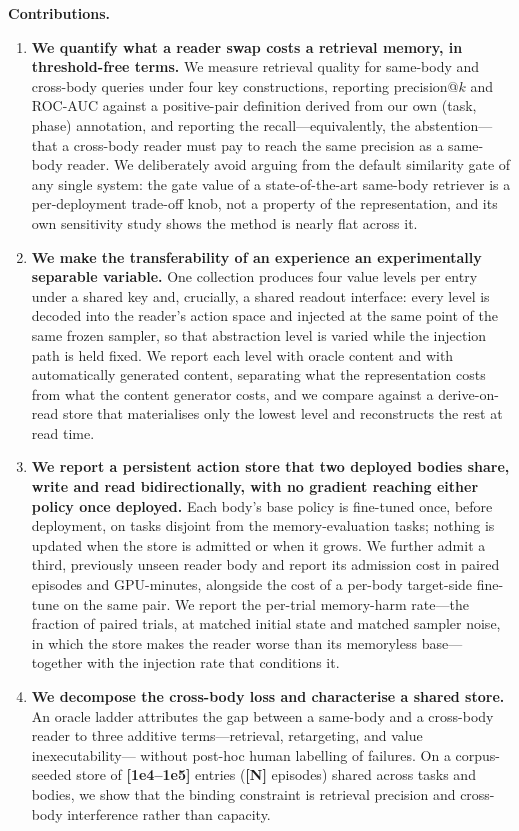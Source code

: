 \documentclass[letterpaper, 10 pt, conference]{ieeeconf}
\newcommand{\todo}[1]{\textbf{[#1]}}
\begin{document}
\noindent\textbf{Contributions.}
\begin{enumerate}
\item \textbf{We quantify what a reader swap costs a retrieval memory, in
threshold-free terms.} We measure retrieval quality for same-body and cross-body
queries under four key constructions, reporting precision@$k$ and ROC-AUC against
a positive-pair definition derived from our own (task, phase) annotation, and
reporting the recall---equivalently, the abstention---that a cross-body reader
must pay to reach the same precision as a same-body reader. We deliberately avoid
arguing from the default similarity gate of any single system: the gate value of
a state-of-the-art same-body retriever is a per-deployment trade-off knob, not a
property of the representation, and its own sensitivity study shows the method is
nearly flat across it.

\item \textbf{We make the transferability of an experience an experimentally
separable variable.} One collection produces four value levels per entry under a
shared key and, crucially, a shared readout interface: every level is decoded
into the reader's action space and injected at the same point of the same frozen
sampler, so that abstraction level is varied while the injection path is held
fixed. We report each level with oracle content and with automatically generated
content, separating what the representation costs from what the content
generator costs, and we compare against a derive-on-read store that materialises
only the lowest level and reconstructs the rest at read time.

\item \textbf{We report a persistent action store that two deployed bodies share,
write and read bidirectionally, with no gradient reaching either policy once
deployed.} Each body's base policy is fine-tuned once, before deployment, on
tasks disjoint from the memory-evaluation tasks; nothing is updated when the
store is admitted or when it grows. We further admit a third, previously unseen
reader body and report its admission cost in paired episodes and GPU-minutes,
alongside the cost of a per-body target-side fine-tune on the same pair. We
report the per-trial memory-harm rate---the fraction of paired trials, at matched
initial state and matched sampler noise, in which the store makes the reader
worse than its memoryless base---together with the injection rate that conditions
it.

\item \textbf{We decompose the cross-body loss and characterise a shared store.}
An oracle ladder attributes the gap between a same-body and a cross-body reader
to three additive terms---retrieval, retargeting, and value inexecutability---
without post-hoc human labelling of failures. On a corpus-seeded store of
\todo{1e4--1e5} entries (\todo{N} episodes) shared across tasks and bodies, we
show that the binding constraint is retrieval precision and cross-body
interference rather than capacity.
\end{enumerate}
\end{document}
